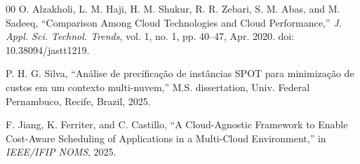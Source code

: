 \documentclass[conference]{IEEEtran}
\begin{document}
\begin{thebibliography}{00}
		 O. Alzakholi, L. M. Haji, H. M. Shukur, R. R. Zebari, S. M. Abas, and M. Sadeeq, ``Comparison Among Cloud Technologies and Cloud Performance,'' \emph{J. Appl. Sci. Technol. Trends}, vol. 1, no. 1, pp. 40--47, Apr. 2020. doi: 10.38094/jastt1219.
		
		 P. H. G. Silva, ``Análise de precificação de instâncias SPOT para minimização de custos em um contexto multi-nuvem,'' M.S. dissertation, Univ. Federal Pernambuco, Recife, Brazil, 2025.
		
		 F. Jiang, K. Ferriter, and C. Castillo, ``A Cloud-Agnostic Framework to Enable Cost-Aware Scheduling of Applications in a Multi-Cloud Environment,'' in \emph{IEEE/IFIP NOMS}, 2025.
		
	\end{thebibliography}
	
\end{document}
